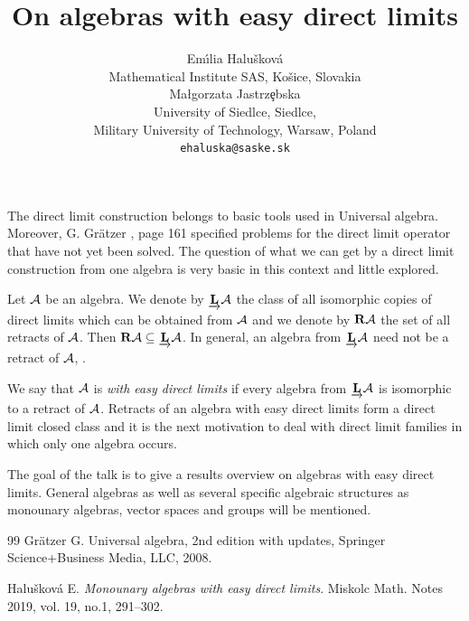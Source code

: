 \documentclass[a4paper]{article} %
\date{} %
\begin{document}
\setcounter{page}{1} %

\title{On algebras with easy direct limits }

\author{Em\' \i lia Halu\v skov\' a\\
Mathematical Institute SAS, Ko\v sice, Slovakia\\
 Ma\l{}gorzata Jastrz\c{e}bska\\
 University of Siedlce, Siedlce,\\
 Military University of Technology, Warsaw,  Poland\\
       \texttt{ehaluska@saske.sk} %
       }%

\maketitle


The direct limit construction belongs to basic tools used in Universal algebra.
Moreover, G. Gr\"atzer \cite{gra}, page 161 specified problems for the direct limit operator that have not yet been solved. 
The question of what we can get by a direct limit construction from one algebra is very basic in this context and little explored.

Let $\cal A$ be an algebra. 
We denote by $\underrightarrow{\mathbf L} {\cal A}$ the class of all isomorphic copies of direct limits which can be obtained from $\cal A$ 
and we denote by ${\mathbf R}{\cal A}$ the set of all retracts of ${\cal A}$.
Then ${\mathbf R}{\cal A} \subseteq \underrightarrow{\mathbf L} {\cal A}$. 
In general, an algebra  from $\underrightarrow{\mathbf L} {\cal A}$ need not be a retract of $\cal A$, \cite{h2}. 
 
We  say that $\cal A$  is \emph{with easy direct limits} if every algebra from 
$\underrightarrow{\mathbf L} {\cal A}$ is isomorphic to a retract of ${\cal A}$.
Retracts of an algebra with easy direct limits form a direct limit closed class and it is the next motivation
to deal with  direct limit families in which only one algebra occurs.

The goal of the talk is to give a results overview on algebras with easy direct limits.
General algebras as well as several specific algebraic structures as monounary algebras, vector spaces and groups will be mentioned.

\begin{thebibliography}{99}
 Gr\"atzer G. Universal algebra, 2nd edition with updates,
Springer Science+Business Media, LLC, 2008. 


 Halu\v skov\'a E. \emph{Monounary algebras with easy direct limits}. Miskolc Math. Notes 2019, vol.  19, no.1, 291--302.
 


\end{thebibliography}
\end{document}
